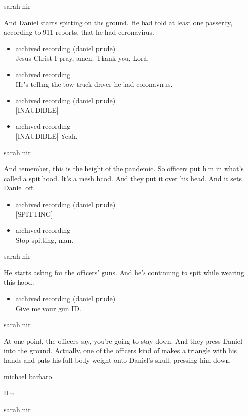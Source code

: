 sarah nir

And Daniel starts spitting on the ground. He had told at least one
passerby, according to 911 reports, that he had coronavirus.

\begin{itemize}
\item
  archived recording (daniel prude)\\
  Jesus Christ I pray, amen. Thank you, Lord.
\item
  archived recording\\
  He's telling the tow truck driver he had coronavirus.
\item
  archived recording (daniel prude)\\
  {[}INAUDIBLE{]}
\item
  archived recording\\
  {[}INAUDIBLE{]} Yeah.
\end{itemize}

sarah nir

And remember, this is the height of the pandemic. So officers put him in
what's called a spit hood. It's a mesh hood. And they put it over his
head. And it sets Daniel off.

\begin{itemize}
\item
  archived recording (daniel prude)\\
  {[}SPITTING{]}
\item
  archived recording\\
  Stop spitting, man.
\end{itemize}

sarah nir

He starts asking for the officers' guns. And he's continuing to spit
while wearing this hood.

\begin{itemize}
\tightlist
\item
  archived recording (daniel prude)\\
  Give me your gun ID.
\end{itemize}

sarah nir

At one point, the officers say, you're going to stay down. And they
press Daniel into the ground. Actually, one of the officers kind of
makes a triangle with his hands and puts his full body weight onto
Daniel's skull, pressing him down.

michael barbaro

Hm.

sarah nir

